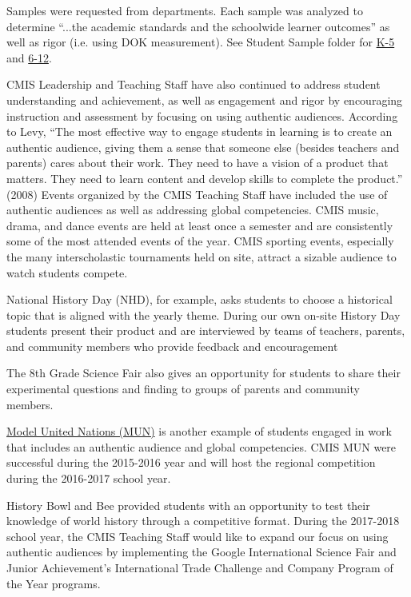 \documentclass{report}
\begin{document}
\begin{findings}

Samples were requested from departments. Each sample was analyzed to determine “...the academic standards and the schoolwide learner outcomes” as well as rigor (i.e. using DOK measurement). See Student Sample folder for \href{https://drive.google.com/drive/folders/0ByVFfrm0zfolVGJzdXpvLV9reVk?usp=sharing}{K-5} and  \href{https://drive.google.com/drive/folders/0ByVFfrm0zfolMkF5aThoSzZxa1E?usp=sharing}{6-12}. 


CMIS Leadership and Teaching Staff have also continued to address student understanding and achievement, as well as engagement and rigor by encouraging instruction and assessment by focusing on using authentic audiences. According to Levy, “The most effective way to engage  students in learning is to create an authentic audience, giving them a sense that someone else (besides teachers and parents) cares about their work. They need to have a vision of a product that matters. They need to learn content and develop skills to complete the product.” (2008)  Events organized by the CMIS Teaching Staff have included the use of authentic audiences as well as addressing global competencies.  CMIS music, drama, and dance events are held at least once a semester and are consistently some of the most attended events of the year. CMIS sporting events, especially the many interscholastic tournaments held on site, attract a sizable audience to watch students compete. 

National History Day (NHD), for example, asks students to choose a historical  topic that is aligned with the yearly theme. During our own on-site History Day students present their product and are interviewed by teams of teachers, parents, and community members who provide feedback and encouragement

The 8th Grade Science Fair also gives an opportunity for students to share their experimental questions and finding to groups of parents and community members. 

\href{https://drive.google.com/drive/folders/0Bwo-i12FeO0rVmRhaGd4QlE5ek0?usp=sharing}{Model United Nations (MUN)} is another example of students engaged in work that includes an authentic audience and global competencies. CMIS MUN were successful during the 2015-2016 year and will host the regional competition during the 2016-2017 school year. 

History Bowl and Bee provided students with an opportunity to test their knowledge of world history through a competitive format. 
During the 2017-2018 school year, the CMIS Teaching Staff would like to expand our focus on using authentic audiences by implementing the Google International Science Fair and Junior Achievement’s International Trade Challenge and  Company Program of the Year programs. 


\end{findings}
\end{document}
